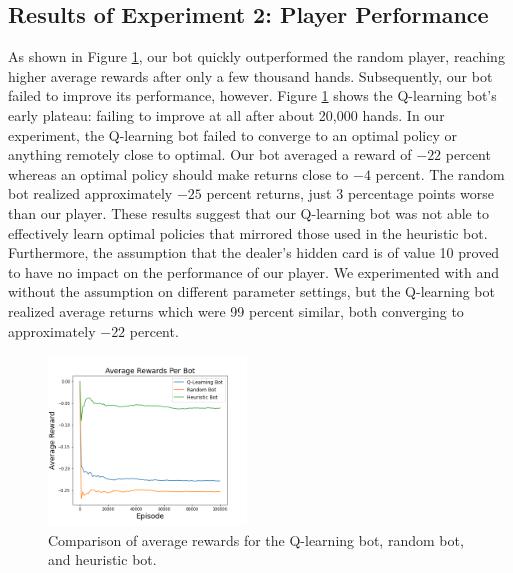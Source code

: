 \subsection{Results of Experiment 2: Player Performance}
\label{sec:resE2}
As shown in Figure \ref{avgRewards}, our bot quickly outperformed the random player, reaching higher average rewards after only a few thousand hands. Subsequently, our bot failed to improve its performance, however. Figure \ref{avgRewards} shows the Q-learning bot's early plateau: failing to improve at all after about 20,000 hands. In our experiment, the Q-learning bot failed to converge to an optimal policy or anything remotely close to optimal. Our bot averaged a reward of $-22$ percent whereas an optimal policy should make returns close to $-4$ percent. The random bot realized approximately $-25$ percent returns, just 3 percentage points worse than our player. These results suggest that our Q-learning bot was not able to effectively learn optimal policies that mirrored those used in the heuristic bot.\\

\noindent Furthermore, the assumption that the dealer's hidden card is of value 10 proved to have no impact on the performance of our player. We experimented with and without the assumption on different parameter settings, but the Q-learning bot realized average returns which were 99 percent similar, both converging to approximately $-22$ percent. 

\begin{figure}[htb]

  \centering  %

  \includegraphics[width=0.47\textwidth]{avgRewardsPerBot.png}


  \caption{Comparison of average rewards for the Q-learning bot, random bot, and heuristic bot.}

  \label{avgRewards}

\end{figure}




